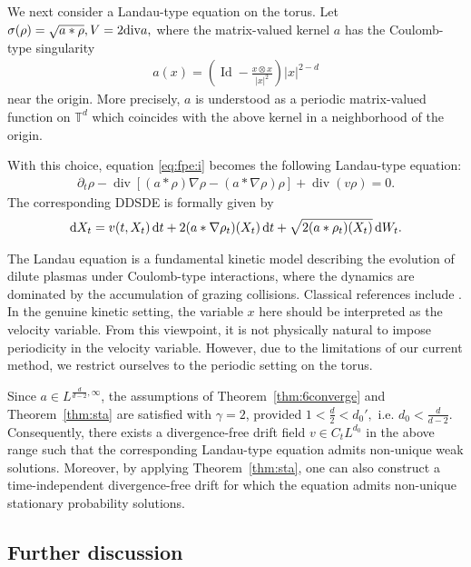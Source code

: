 \documentclass[UTF-8,reqno]{amsart}
\numberwithin{equation}{section}
\theoremstyle{definition}
\def\dif{{\mathord{{\rm d}}}}
\def\div{\mathord{{\rm div}}}
\def\dif{{\mathord{{\rm d}}}}
\def\div{\mathord{{\rm div}}}
\begin{document}
We next consider a Landau-type equation on the torus. Let
$
\sigma(\rho)=\sqrt{a*\rho},
V=2\div a,
$
where the matrix-valued kernel $a$ has the Coulomb-type singularity
\begin{align*}
a(x)
=
\left(
\operatorname{Id}
-
\frac{x\otimes x}{|x|^2}
\right)
|x|^{2-d}
\end{align*}
near the origin. More precisely, $a$ is understood as a periodic
matrix-valued function on $\mathbb{T}^d$ which coincides with the above
kernel in a neighborhood of the origin.  

With this choice, equation \eqref{eq:fpe:i} becomes the following
Landau-type equation:
\begin{align*}
\partial_t\rho
-
\operatorname{div}
\left[
(a*\rho)\nabla\rho
-
(a*\nabla\rho)\rho
\right]
+
\operatorname{div}(v\rho)
=
0 .
\end{align*}
The corresponding DDSDE is formally given by
\begin{align*}
\dif X_t
=
v(t,X_t)\,\dif t
+
2(a*\nabla\rho_t)(X_t)\,\dif t
+
\sqrt{2 (a*\rho_t)(X_t)}\,\dif W_t .
\end{align*} 

The Landau equation is a fundamental kinetic model describing the evolution of
dilute plasmas under Coulomb-type interactions, where the dynamics are
dominated by the accumulation of grazing collisions. Classical references
include \cite{Lan36,Vil98,Vil02}. In the genuine kinetic setting, the variable
$x$ here should be interpreted as the velocity variable. From this viewpoint,
it is not physically natural to impose periodicity in the velocity variable.
However, due to the limitations of our current method, we restrict ourselves
to the periodic setting on the torus.

Since  $
a\in
L^{\frac{d}{d-2},\infty} $,  the assumptions of Theorem~\ref{thm:6converge} and
Theorem~\ref{thm:sta} are satisfied with $\gamma=2$, provided
$
1<\frac{d}{2}<d_0',
$ i.e. $d_0<\frac{d}{d-2}$.
Consequently, there exists a divergence-free drift field
$
v\in C_tL^{d_0} 
$
 in the above range such that the corresponding Landau-type
equation admits non-unique weak solutions. Moreover, by applying
Theorem~\ref{thm:sta}, one can also construct a time-independent
divergence-free drift
for which the  equation admits non-unique
stationary probability solutions. 
 
\subsection{Further discussion}
\end{document}

